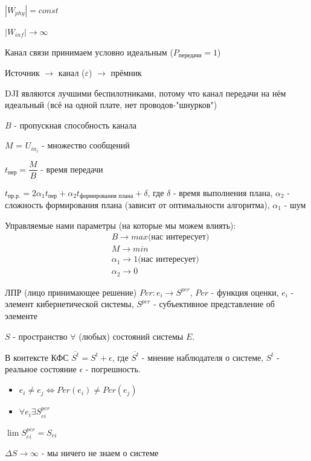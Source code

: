\documentclass{article}
\begin{document}
\begin{sloppypar}
    $|W_{phy}| = const$

    $|W_{inf}| \rightarrow \infty$

    Канал связи принимаем условно идеальным ($P_{\text{передачи}} = 1$)

    Источник $\rightarrow$ канал ($\varepsilon$) $\rightarrow$ прёмник

    DJI являются лучшими беспилотниками, потому что канал передачи на нём идеальный (всё на одной плате, нет проводов-"шнурков")

    $B$ - пропускная способность канала

    $M$ = $U_{in_i}$ - множество сообщений

    $t_{\text{пер}} = \dfrac{M}{B}$ - время передачи

    $t_{пр. р.} = 2\alpha_1t_{\text{пер}} + \alpha_2t_{\text{формирования плана}} + \delta$, где $\delta$ - время выполнения плана, $\alpha_2$ - сложность формирования плана (зависит от оптимальности алгоритма), $\alpha_1$ - шум

    Управляемые нами параметры (на которые мы можем влиять):
    \begin{align*}
         & B \rightarrow max \text{(нас интересует)}      \\
         & M \rightarrow min                              \\
         & \alpha_1 \rightarrow 1 \text{(нас интересует)} \\
         & \alpha_2 \rightarrow 0
    \end{align*}

    ЛПР (лицо принимающее решение)
    $Per : e_i \rightarrow S^{per}$, $Per$ - функция оценки, $e_i$ - элемент кибернетической системы, $S^{per}$ - субъективное представление об элементе

    $S$ - пространство $\forall$ (любых) состояний системы $E$.

    В контексте КФС $\overline{S^t} = S^t + \epsilon$, где $\overline{S^t}$ - мнение наблюдателя о системе, $S^t$ - реальное состояние $\epsilon$ - погрешность.

    \begin{itemize}
        \item $e_i \neq e_j \Leftrightarrow Per(e_i) \neq Per(e_j)$
        \item $\forall e_i \exists S^{per}_{ei}$
    \end{itemize}
    $\lim S_{ei}^{per} = S_{ei}$

    $\Delta S \rightarrow \infty$ - мы ничего не знаем о системе


\end{sloppypar}
\end{document}
